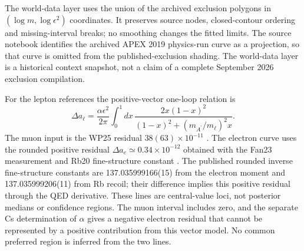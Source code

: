 The world-data layer uses the union of the archived exclusion polygons in
$(\log m,\log\epsilon^2)$ coordinates. It preserves source nodes, closed-contour
ordering and missing-interval breaks; no smoothing changes the fitted limits.
The source notebook identifies the archived APEX 2019 physics-run curve as
a projection, so that curve is omitted from the published-exclusion shading.
The world-data layer is a historical context snapshot, not a claim of a
complete September 2026 exclusion compilation.

For the lepton references the positive-vector one-loop relation is
\begin{equation}
 \Delta a_\ell=\frac{\alpha\epsilon^2}{2\pi}
 \int_0^1\!dx\,\frac{2x(1-x)^2}{(1-x)^2+(m_{A^\prime}/m_\ell)^2x}.
\end{equation}
The muon input is the WP25 residual $38(63)\times10^{-11}$
\cite{MuonWP2025}. The electron curve uses the rounded positive residual
$\Delta a_e\simeq0.34\times10^{-12}$ obtained with the Fan23 measurement and
Rb20 fine-structure constant \cite{ElectronFan2023,AlphaMorel2020}.
The published rounded inverse fine-structure constants are
137.035999166(15) from the electron moment and 137.035999206(11) from Rb recoil;
their difference implies this positive residual through the QED derivative.
These lines are central-value loci, not posterior medians or confidence
regions. The muon interval includes zero, and the separate Cs determination
of $\alpha$ gives a negative electron residual that cannot be represented by
a positive contribution from this vector model. No common preferred region
is inferred from the two lines.
